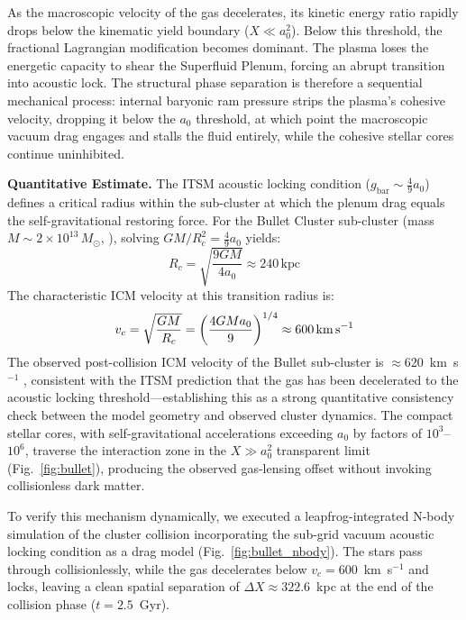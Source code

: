 \documentclass[aps,prd,10pt,twocolumn,superscriptaddress,nofootinbib,floatfix]{revtex4-2}
\begin{document}
As the macroscopic velocity of the gas decelerates, its kinetic energy ratio rapidly drops below the kinematic yield boundary ($X \ll a_0^2$). Below this threshold, the fractional Lagrangian modification becomes dominant. The plasma loses the energetic capacity to shear the Superfluid Plenum, forcing an abrupt transition into acoustic lock. The structural phase separation is therefore a sequential mechanical process: internal baryonic ram pressure strips the plasma's cohesive velocity, dropping it below the $a_0$ threshold, at which point the macroscopic vacuum drag engages and stalls the fluid entirely, while the cohesive stellar cores continue uninhibited.

\textbf{Quantitative Estimate.}
The ITSM acoustic locking condition ($g_{\text{bar}} \sim \frac{4}{9}a_0$) defines a critical radius within the sub-cluster at which the plenum drag equals the self-gravitational restoring force. For the Bullet Cluster sub-cluster (mass $M \sim 2 \times 10^{13}\,M_\odot$, \citealt{bullet}), solving $GM/R_c^2 = \frac{4}{9}a_0$ yields:
\begin{equation}
R_c = \sqrt{\frac{9GM}{4a_0}} \approx 240\,\text{kpc}
\end{equation}
The characteristic ICM velocity at this transition radius is:
\begin{equation}
v_c = \sqrt{\frac{GM}{R_c}} = \left(\frac{4GM a_0}{9}\right)^{1/4} \approx 600\,\text{km\,s}^{-1}
\end{equation}
The observed post-collision ICM velocity of the Bullet sub-cluster is $\approx 620$~km~s$^{-1}$ \cite{markevitch}, consistent with the ITSM prediction that the gas has been decelerated to the acoustic locking threshold---establishing this as a strong quantitative consistency check between the model geometry and observed cluster dynamics. The compact stellar cores, with self-gravitational accelerations exceeding $a_0$ by factors of $10^3$--$10^6$, traverse the interaction zone in the $X \gg a_0^2$ transparent limit (Fig.~\ref{fig:bullet}), producing the observed gas-lensing offset without invoking collisionless dark matter.

To verify this mechanism dynamically, we executed a leapfrog-integrated N-body simulation of the cluster collision incorporating the sub-grid vacuum acoustic locking condition as a drag model (Fig.~\ref{fig:bullet_nbody}). The stars pass through collisionlessly, while the gas decelerates below $v_c = 600$~km~s$^{-1}$ and locks, leaving a clean spatial separation of $\Delta X \approx 322.6$~kpc at the end of the collision phase ($t=2.5$~Gyr).
\end{document}
